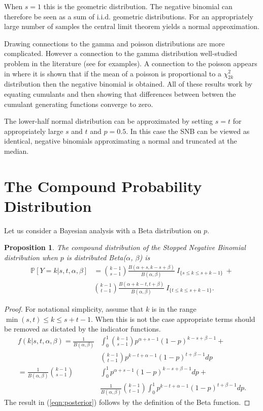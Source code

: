 \documentclass[review]{elsarticle}
\newtheorem{prop}{Proposition}
\begin{document}
When $s=1$ this is the geometric distribution. The negative
binomial can therefore be seen as a sum of i.i.d. geometric distributions.
For an appropriately large number of samples the central limit theorem
yields a normal approximation.

Drawing connections to the gamma and poisson distributions are more complicated.
However a connection to the gamma distribution well-studied problem in the 
literature (see \cite{Ord1968,Guenther1972,Best1974} for examples). 
A connection to the poisson appears in \cite{Anscombe1950} where
it is shown that if the mean of a poisson is proportional
to a $\chi^2_{2k}$ distribution then the negative binomial is obtained. 
All of these results work by equating cumulants and then showing 
that differences between betwen the cumulant generating
functions converge to zero.

The lower-half normal distribution can be approximated by setting $s=t$
for appropriately large $s$ and $t$ and $p = 0.5$. In this
case the SNB can be viewed as identical, negative binomials
approximating a normal and truncated at the median.

\section{The Compound Probability Distribution}

Let us consider a Bayesian analysis with a Beta distribution on $p$.
\begin{prop} \label{prop:bayesian}
The compound distribution of the Stopped Negative Binomial 
distribution when $p$ is distributed Beta($\alpha$, $\beta$) is
\begin{align} \label{eqn:posterior}
\mathbb{P} [Y = k | s, t, \alpha, \beta ] &= 
  {k-1 \choose s-1} \frac{B\left(\alpha+s, k-s+\beta \right)}{B(\alpha, \beta)} 
    \ I_{\{s \leq k \leq s+k-1\}} \ + \nonumber \\
  & {k-1 \choose t-1} 
    \frac{B\left(\alpha + k - t, t+\beta\right)}{B(\alpha, \beta)} 
    \ I_{\{t \leq k \leq s+k-1\}}.
\end{align}
\end{prop}
\begin{proof}
For notational simplicity, assume that $k$ is in the range
$\min(s,t) \leq k \leq s+t-1$. When 
this is not the case appropriate terms should be removed as dictated by the indicator functions.
\begin{align*}
f(k | s, t, \alpha, \beta) = \frac{1}{B(\alpha, \beta)} & \int_0^1 {k-1 \choose s-1} p^{\alpha +s -1} \left(1-p\right)^{k-s+\beta-1} + \\
 & {k-1 \choose t-1} p^{k-t+\alpha-1}\left(1-p\right)^{t+\beta-1} dp \\
= \frac{1}{B(\alpha, \beta)}  {k-1 \choose s-1} & \int_0^1  p^{\alpha +s -1} \left(1-p\right)^{k-s+\beta-1} dp + \\
 & \frac{1}{B(\alpha, \beta)} {k-1 \choose t-1} \int_0^1  p^{k-t+\alpha-1}\left(1-p\right)^{t+\beta-1} dp.
\end{align*}
The result in (\ref{eqn:posterior}) follows by the definition of the 
Beta function.
\end{proof}
\end{document}
